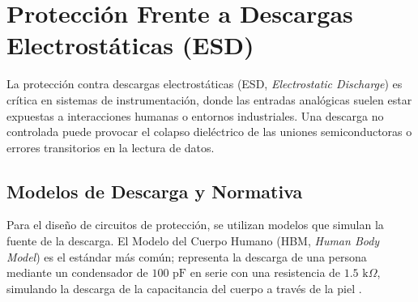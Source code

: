 \begin{marginfigure}
    \centering
    \caption[Esquema de inductor de modo común.]{Inductor de modo común. La suma de campos magnéticos en el núcleo crea una impedancia elevada para las corrientes que viajan en el mismo sentido (modo común), mientras que la señal diferencial permanece inalterada.}\label{fig:ferrita_modo_comun}
\end{marginfigure}

\section{Protección Frente a Descargas Electrostáticas (ESD)}\label{sec:esd}

La protección contra descargas electrostáticas (ESD, \textit{Electrostatic Discharge}) es crítica en sistemas de instrumentación, donde las entradas analógicas suelen estar expuestas a interacciones humanas o entornos industriales. Una descarga no controlada puede provocar el colapso dieléctrico de las uniones semiconductoras o errores transitorios en la lectura de datos.

\subsection{Modelos de Descarga y Normativa}

Para el diseño de circuitos de protección, se utilizan modelos que simulan la fuente de la descarga. El Modelo del Cuerpo Humano (HBM, \textit{Human Body Model}) es el estándar más común; representa la descarga de una persona mediante un condensador de $100\text{ pF}$ en serie con una resistencia de $1.5\text{ k}\Omega$, simulando la descarga de la capacitancia del cuerpo a través de la piel \cite{ott1988noise}.

